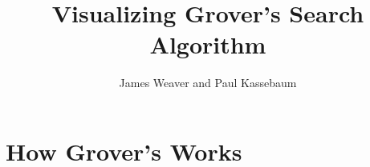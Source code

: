 \documentclass[12pt]{amsart}
\title{Visualizing Grover's Search Algorithm}
\author{James Weaver and Paul Kassebaum}
\date{} %
\begin{document}
\maketitle

\section{How Grover's Works}
\end{document}
